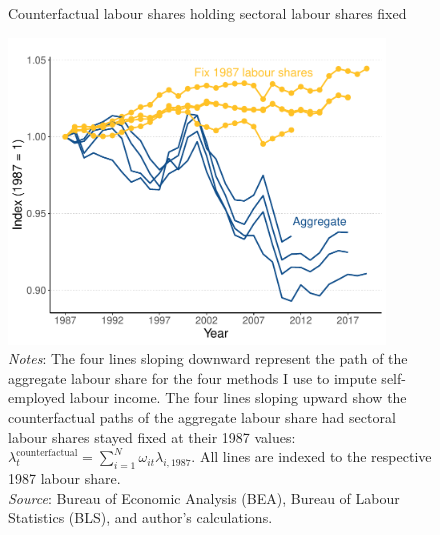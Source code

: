 \begin{figure}[h]
    \centering
    \caption{\normalsize Counterfactual labour shares holding sectoral labour shares fixed}
    \includegraphics[width=10cm]{Puzzle/counterfactual_graph_index.pdf}

    \label{fig:counterfactual_index}

\begin{minipage}{\linewidth}
    \caption*{\textit{Notes}: The four lines sloping downward represent the path of the aggregate labour share for the four methods I use to impute self-employed labour income. The four lines sloping upward show the counterfactual paths of the aggregate labour share had sectoral labour shares stayed fixed at their 1987 values: $\lambda_{t}^{\text{counterfactual}} = \sum_{i=1}^{N}\omega_{it}\lambda_{i,1987}$. All lines are indexed to the respective 1987 labour share. \\
    \textit{Source}: Bureau of Economic Analysis (BEA), Bureau of Labour Statistics (BLS), and author's calculations.}
\end{minipage}
\end{figure}




